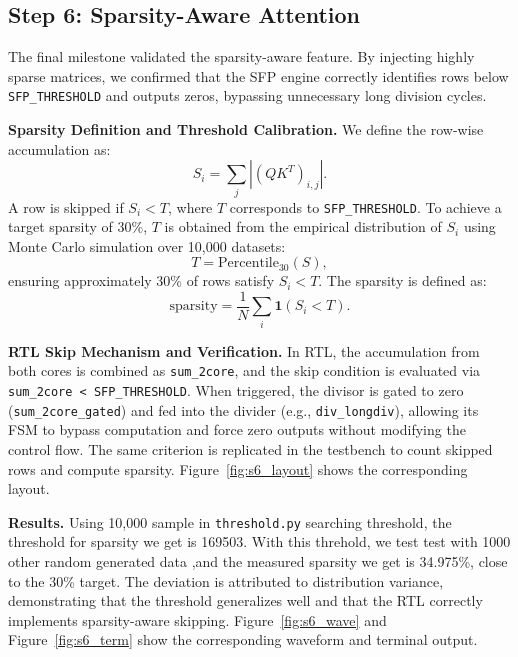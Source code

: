 \documentclass[journal]{IEEEtran}
\begin{document}
\subsection{Step 6: Sparsity-Aware Attention}
The final milestone validated the sparsity-aware feature. By injecting highly sparse matrices, we confirmed that the SFP engine correctly identifies rows below \texttt{SFP\_THRESHOLD} and outputs zeros, bypassing unnecessary long division cycles.

\textbf{Sparsity Definition and Threshold Calibration.}
We define the row-wise accumulation as:
\begin{equation}
S_i = \sum_{j} \left| (QK^T)_{i,j} \right|.
\end{equation}
A row is skipped if $S_i < T$, where $T$ corresponds to \texttt{SFP\_THRESHOLD}. To achieve a target sparsity of 30\%, $T$ is obtained from the empirical distribution of $S_i$ using Monte Carlo simulation over 10{,}000 datasets:
\begin{equation}
T = \text{Percentile}_{30}(S),
\end{equation}
ensuring approximately 30\% of rows satisfy $S_i < T$. The sparsity is defined as:
\begin{equation}
\text{sparsity} = \frac{1}{N} \sum_i \mathbf{1}(S_i < T).
\end{equation}

\textbf{RTL Skip Mechanism and Verification.}
In RTL, the accumulation from both cores is combined as \texttt{sum\_2core}, and the skip condition is evaluated via \texttt{sum\_2core < SFP\_THRESHOLD}. When triggered, the divisor is gated to zero (\texttt{sum\_2core\_gated}) and fed into the divider (e.g., \texttt{div\_longdiv}), allowing its FSM to bypass computation and force zero outputs without modifying the control flow. The same criterion is replicated in the testbench to count skipped rows and compute sparsity. Figure~\ref{fig:s6_layout} shows the corresponding layout.

\textbf{Results.}
Using 10{,}000 sample in \texttt{threshold.py} searching threshold, the threshold for sparsity we get is 169503. With this threhold, we test test with 1000 other random generated data ,and the measured sparsity we get is 34.975\%, close to the 30\% target. The deviation is attributed to distribution variance, demonstrating that the threshold generalizes well and that the RTL correctly implements sparsity-aware skipping. Figure~\ref{fig:s6_wave} and Figure~\ref{fig:s6_term} show the corresponding waveform and terminal output.
\end{document}
